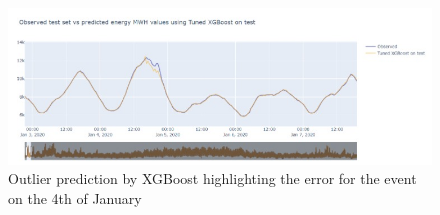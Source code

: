 \documentclass[mstat,12pt]{unswthesis}
\begin{document}
\begin{figure}[H]
\includegraphics[width=140mm]{XGBoost_Tune.jpeg}
\caption{Outlier prediction by XGBoost highlighting the error for the event on the 4th of January }
\label{XGTune}
\end{figure}
\end{document}
